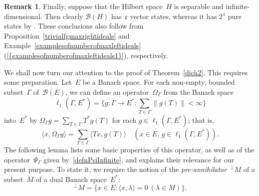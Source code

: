 \documentclass[12pt]{amsart}
\theoremstyle{definition}
\newtheorem{remark}[theorem]{Remark}
\numberwithin{equation}{section}
\begin{document}
\begin{remark}
  Finally, suppose that the Hilbert space~$H$ is separable and
  infinite-dimensional. Then clearly $\mathscr{B}(H)$
  has~$\mathfrak{c}$ vector states, whereas it has
  $2^{\,\mathfrak{c}}$ pure states by
  \cite[Propo\-si\-tion~10.4.15]{kr2}. These conclusions also follow
  from Proposition~\ref{trivialfgmaxrightideals} and
  Example~\ref{examplesofnumberofmaxleftideals}  {{\normalfont\textrm{(\ref{{examplesofnumberofmaxleftideals1}})}}}, respectively.
\end{remark}

We shall now turn our attention to the proof of Theorem~\ref{dich2}.
This requires some prepara\-tion.  Let~$E$ be a Banach space. For each
non-empty, bounded subset~$\Gamma$ of~$\mathscr{B}(E)$, we can define
an operator~$\Omega_\Gamma$ from the Banach space
\[ \ell_1(\Gamma,E^*) = \biggl\{ g\colon\Gamma\to E^* :
\sum_{T\in\Gamma} \| g(T)\|<\infty\biggr\} \] into~$E^*$ by
$\Omega_\Gamma g = \sum_{T\in\Gamma}T^*g(T)$ for each
$g\in\ell_1(\Gamma,E^*)$; that is,
\begin{equation}\label{defnOmegaGamma} 
  \langle x,\Omega_\Gamma g\rangle = 
  \sum_{T\in\Gamma}\bigl\langle Tx,g(T)\bigr\rangle\quad 
  (x\in E,\, g\in \ell_1(\Gamma,E^*)). 
\end{equation} 
The following lemma lists some basic properties of this operator, as
well as of the operator~$\Psi_\Gamma$ given
by~\eqref{defnPsiInfinite}, and explains their rele\-vance for our
present purpose. To state it, we require the notion of the
\emph{pre-annihila\-tor}~$\mbox{}^\perp M$ of a subset~$M$ of a dual
Banach space~$E^*$:
\[ \mbox{}^\perp M = \bigl\{ x\in E : \langle x, \lambda\rangle = 0\
   (\lambda\in M)\bigr\}. \]
\end{document}
